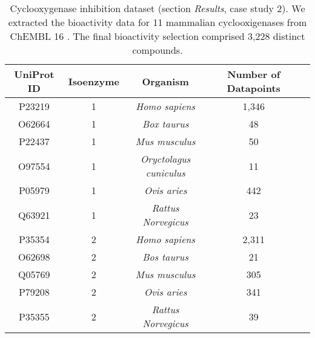 \documentclass{bmcart}
\begin{document}
\begin{backmatter}
\begin{table}[htb!]
\centering
\begin{tabulary}{1\textwidth}{CCCCC}
\hline
UniProt ID&Isoenzyme&Organism&Number of Datapoints \\
\hline
P23219&1&{\it Homo sapiens}&1,346\\
O62664&1&{\it Box taurus}&48\\%
P22437&1&{\it Mus musculus}&50\\%
O97554&1&{\it Oryctolagus cuniculus}&11\\%
P05979&1&{\it Ovis aries}&442\\%
Q63921&1&{\it Rattus Norvegicus}&23\\ %
P35354&2&{\it Homo sapiens}&2,311\\ %
O62698&2&{\it Bos taurus}&21\\ %
Q05769&2&{\it Mus musculus}&305\\ %
P79208&2&{\it Ovis aries}&341 \\ %
P35355&2&{\it Rattus Norvegicus}&39 \\ %
\hline
\end{tabulary}
\caption{Cyclooxygenase inhibition dataset (section {\it Results}, case study 2).
We extracted the bioactivity data for 11 mammalian cyclooxigenases from ChEMBL 16 \cite{chembl}.
The final bioactivity selection comprised 3,228 distinct compounds.
}
\label{tab:cox}
\end{table}


\end{backmatter}
\end{document}
